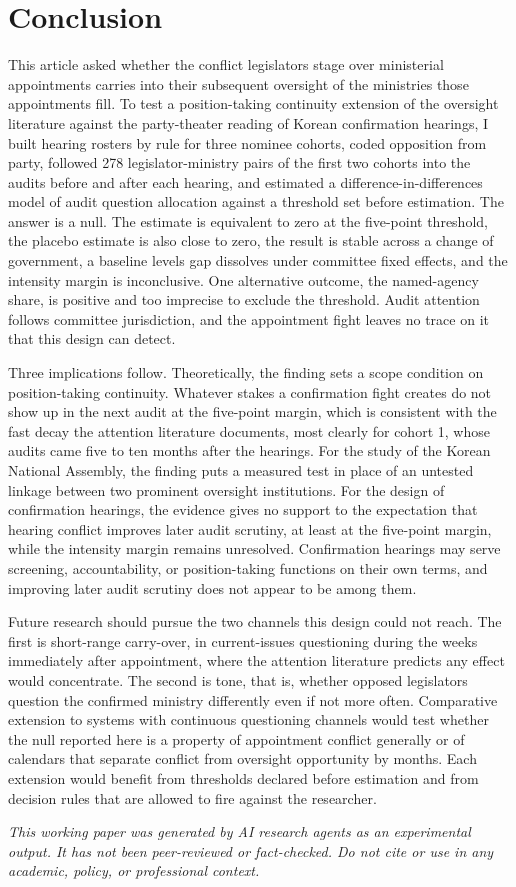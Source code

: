 \documentclass[11pt]{article}
\begin{document}
\section{Conclusion}

This article asked whether the conflict legislators stage over ministerial appointments carries into their subsequent oversight of the ministries those appointments fill. To test a position-taking continuity extension of the oversight literature against the party-theater reading of Korean confirmation hearings, I built hearing rosters by rule for three nominee cohorts, coded opposition from party, followed 278 legislator-ministry pairs of the first two cohorts into the audits before and after each hearing, and estimated a difference-in-differences model of audit question allocation against a threshold set before estimation. The answer is a null. The estimate is equivalent to zero at the five-point threshold, the placebo estimate is also close to zero, the result is stable across a change of government, a baseline levels gap dissolves under committee fixed effects, and the intensity margin is inconclusive. One alternative outcome, the named-agency share, is positive and too imprecise to exclude the threshold. Audit attention follows committee jurisdiction, and the appointment fight leaves no trace on it that this design can detect.

Three implications follow. Theoretically, the finding sets a scope condition on position-taking continuity. Whatever stakes a confirmation fight creates do not show up in the next audit at the five-point margin, which is consistent with the fast decay the attention literature documents, most clearly for cohort 1, whose audits came five to ten months after the hearings. For the study of the Korean National Assembly, the finding puts a measured test in place of an untested linkage between two prominent oversight institutions. For the design of confirmation hearings, the evidence gives no support to the expectation that hearing conflict improves later audit scrutiny, at least at the five-point margin, while the intensity margin remains unresolved. Confirmation hearings may serve screening, accountability, or position-taking functions on their own terms, and improving later audit scrutiny does not appear to be among them.

Future research should pursue the two channels this design could not reach. The first is short-range carry-over, in current-issues questioning during the weeks immediately after appointment, where the attention literature predicts any effect would concentrate. The second is tone, that is, whether opposed legislators question the confirmed ministry differently even if not more often. Comparative extension to systems with continuous questioning channels would test whether the null reported here is a property of appointment conflict generally or of calendars that separate conflict from oversight opportunity by months. Each extension would benefit from thresholds declared before estimation and from decision rules that are allowed to fire against the researcher.

\bigskip
\noindent\textit{This working paper was generated by AI research agents as an
experimental output. It has not been peer-reviewed or fact-checked.
Do not cite or use in any academic, policy, or professional context.}



\end{document}

